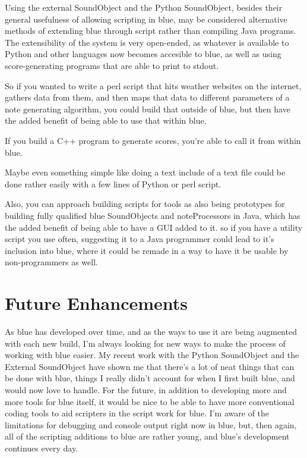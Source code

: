 Using the external SoundObject and the Python SoundObject, besides their
general usefulness of allowing scripting in blue, may be considered
alternative methods of extending blue through script rather than
compiling Java programs. The extensibility of the system is very
open-ended, as whatever is available to Python and other languages now
becomes accesible to blue, as well as using score-generating programs
that are able to print to stdout.

So if you wanted to write a perl script that hits weather websites on
the internet, gathers data from them, and then maps that data to
different parameters of a note generating algorithm, you could build
that outside of blue, but then have the added benefit of being able to
use that within blue.

If you build a C++ program to generate scores, you're able to call it
from within blue.

Maybe even something simple like doing a text include of a text file
could be done rather easily with a few lines of Python or perl script.

Also, you can approach building scripts for tools as also being
prototypes for building fully qualified blue SoundObjects and
noteProcessors in Java, which has the added benefit of being able to
have a GUI added to it. so if you have a utility script you use often,
suggesting it to a Java programmer could lead to it's inclusion into
blue, where it could be remade in a way to have it be usable by
non-programmers as well.

\section{Future Enhancements}

As blue has developed over time, and as the ways to use it are being
augmented with each new build, I'm always looking for new ways to make
the process of working with blue easier. My recent work with the Python
SoundObject and the External SoundObject have shown me that there's a
lot of neat things that can be done with blue, things I really didn't
account for when I first built blue, and would now love to handle. For
the future, in addition to developing more and more tools for blue
itself, it would be nice to be able to have more conventional coding
tools to aid scripters in the script work for blue. I'm aware of the
limitations for debugging and console output right now in blue, but,
then again, all of the scripting additions to blue are rather young, and
blue's development continues every day.

